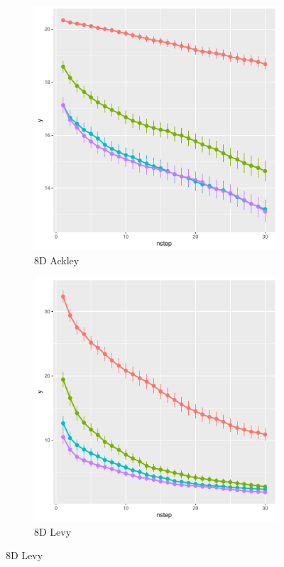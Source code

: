 \documentclass [PhD] {package/uclathes}
\begin{document}
\begin{figure}
\begin{subfigure}[b]{0.3\textwidth}
\end{subfigure}
\begin{subfigure}[b]{0.3\textwidth}
\centering
\caption{8D Ackley}
\includegraphics[width=\textwidth]{chapters/EGO/pdfs/ackley8_lineplot}
\end{subfigure}
\begin{subfigure}[b]{0.3\textwidth}
\centering
\caption{8D Levy}
\includegraphics[width=\textwidth]{chapters/EGO/pdfs/levy8_lineplot}

\end{subfigure}
\end{figure}
\end{document}
